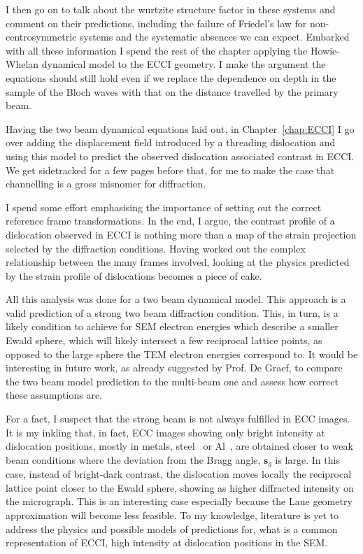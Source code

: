 I then go on to talk about the wurtzite structure factor in these systems and comment on their predictions, including the failure of Friedel's law for non-centrosymmetric systems and the systematic absences we can expect. Embarked with all these information I spend the rest of the chapter applying the Howie-Whelan dynamical model to the ECCI geometry. I make the argument the equations should still hold even if we replace the dependence on depth in the sample of the Bloch waves with that on the distance travelled by the primary beam.  

Having the two beam dynamical equations laid out, in Chapter~\ref{chap:ECCI} I go over adding the displacement field introduced by a threading dislocation and using this model to predict the observed dislocation associated contrast in ECCI. We get sidetracked for a few pages before that, for me to make the case that channelling is a gross misnomer for diffraction. 

I spend some effort emphasising the importance of setting out the correct reference frame transformations. In the  end, I argue, the contrast profile of a dislocation observed in ECCI is nothing more than a map of the strain projection selected by the diffraction conditions. Having worked out the complex relationship between the many frames involved, looking at the physics predicted by the strain profile of dislocations becomes a piece of cake.  

All this analysis was done for a two beam dynamical model. This approach is a valid prediction of a strong two beam diffraction condition. This, in turn, is a likely condition to achieve for SEM electron energies which describe a smaller Ewald sphere, which will likely intersect a few reciprocal lattice points, as opposed to the large sphere the TEM electron energies correspond to. It would be interesting in future work, as already suggested by Prof. De Graef, to compare the two beam model prediction to the multi-beam one and assess how correct these assumptions are. 

For a fact, I suspect that the strong beam is not always fulfilled in ECC images. It is my inkling that, in fact, ECC images showing only bright intensity at dislocation positions, mostly in metals, \eg steel~\cite{Gutierrez09} or Al~\cite{Barnoush10}, are obtained closer to weak beam conditions where the deviation from the Bragg angle, $\mathbf{s}_g$ is large. In this case, instead of bright-dark contrast, the dislocation moves locally the reciprocal lattice point closer to the Ewald sphere, showing as higher diffracted intensity on the micrograph. This is an interesting case especially because the Laue geometry approximation will become less feasible. To my knowledge, literature is yet to address the physics and possible models of predictions for, what is a common representation of ECCI, high intensity at dislocation positions in the SEM. 


